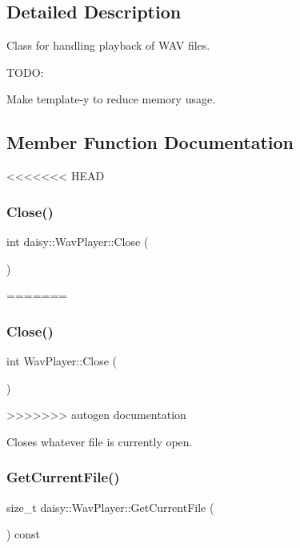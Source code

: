 \subsection{Detailed Description}
Class for handling playback of W\+AV files.

T\+O\+DO\+:
\begin{DoxyItemize}
\item Make template-\/y to reduce memory usage. 
\end{DoxyItemize}

\subsection{Member Function Documentation}
<<<<<<< HEAD
\mbox{\label{classdaisy_1_1_wav_player_adc0c84ee0ecc56e734908a8c1384c5c2}} 
\subsubsection{\texorpdfstring{Close()}{Close()}}
{\footnotesize\ttfamily int daisy\+::\+Wav\+Player\+::\+Close (\begin{DoxyParamCaption}{ }\end{DoxyParamCaption})}
=======
\mbox{\label{classdaisy_1_1_wav_player_a97d6bb179d9688d747115a29338c6e03}} 
\subsubsection{\texorpdfstring{Close()}{Close()}}
{\footnotesize\ttfamily int Wav\+Player\+::\+Close (\begin{DoxyParamCaption}{ }\end{DoxyParamCaption})}
>>>>>>> autogen documentation

Closes whatever file is currently open. \mbox{\label{classdaisy_1_1_wav_player_a3c49d490da98fe5280947dc7889866c1}} 
\subsubsection{\texorpdfstring{Get\+Current\+File()}{GetCurrentFile()}}
{\footnotesize\ttfamily size\+\_\+t daisy\+::\+Wav\+Player\+::\+Get\+Current\+File (\begin{DoxyParamCaption}{ }\end{DoxyParamCaption}) const\hspace{0.3cm}{\ttfamily [inline]}}

